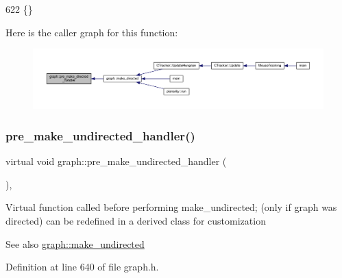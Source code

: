 \begin{DoxyCode}
622 \{\}
\end{DoxyCode}
Here is the caller graph for this function\+:
\nopagebreak
\begin{figure}[H]
\begin{center}
\leavevmode
\includegraphics[width=350pt]{classgraph_a505198f412b1e426e9d09b62ea9811e8_icgraph}
\end{center}
\end{figure}
\mbox{\label{classgraph_a8964107991e6f411ba8992f6b1deda21}} 
\subsubsection{\texorpdfstring{pre\+\_\+make\+\_\+undirected\+\_\+handler()}{pre\_make\_undirected\_handler()}}
{\footnotesize\ttfamily virtual void graph\+::pre\+\_\+make\+\_\+undirected\+\_\+handler (\begin{DoxyParamCaption}{ }\end{DoxyParamCaption})\hspace{0.3cm}{\ttfamily [inline]}, {\ttfamily [virtual]}}

Virtual function called before performing make\+\_\+undirected; (only if graph was directed) can be redefined in a derived class for customization

\begin{DoxySeeAlso}{See also}
\mbox{\hyperlink{classgraph_a31c8b895bd842f1b9dcc67649956cfc7}{graph\+::make\+\_\+undirected}} 
\end{DoxySeeAlso}


Definition at line 640 of file graph.\+h.


